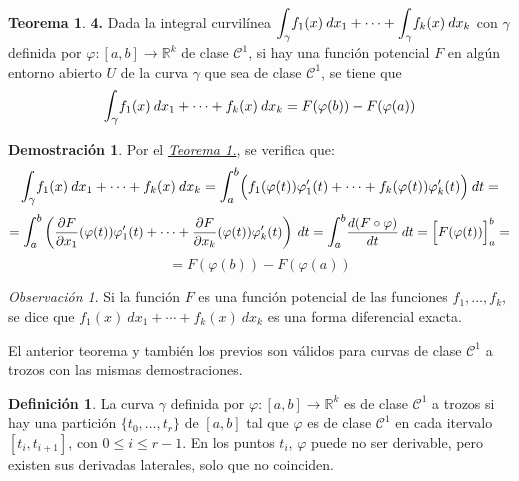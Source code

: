 \documentclass[12pt,twoside]{report}
\newcommand\mc[1]{\mathcal{#1}}
\theoremstyle{azul}
\theoremstyle{azul2}
\theoremstyle{plain}
\theoremstyle{definition}
\newtheorem{defin}{Definición}[chapter]
\newtheorem*{dem}{Demostración}
\newtheorem*{theo}{Teorema}
\theoremstyle{remark}
\newtheorem*{obs}{Observación}
\begin{document}
\begin{theo} \textbf{4.}
Dada la integral curvilínea $\mathlarger{\int_{\gamma}} f_1(x) \: dx_1 + \cdots + \mathlarger{\int_{\gamma}} f_k(x) \: dx_k$ con $\gamma$ definida por $\varphi: [a,b] \longrightarrow \mathbb{R}^k$ de clase $\mc{C}^1$, si hay una función potencial $F$ en algún entorno abierto $U$ de la curva $\gamma$ que sea de clase $\mc{C}^1$, se tiene que $$\mathlarger{\int_{\gamma}} f_1(x) \: dx_1 + \cdots +  f_k(x) \: dx_k=F(\varphi(b)) - F(\varphi(a))$$ 
\end{theo}
\begin{dem}
Por el \hyperref[teo11]{\textit{Teorema 1.}}, se verifica que: $$\mathlarger{\int_{\gamma}} f_1(x) \: dx_1 + \cdots +  f_k(x) \: dx_k = \mathlarger{\int_{a}^b} \Big( f_1(\varphi(t)) \varphi_1'(t) + \cdots + f_k(\varphi(t)) \varphi_k'(t) \Big)\: dt =$$ $$=\mathlarger{\int_{a}^b} \left(\dfrac{\partial F}{\partial x_1}(\varphi(t)) \varphi_1'(t) + \cdots + \dfrac{\partial F}{\partial x_k}(\varphi(t)) \varphi_k'(t) \right) \: dt = \mathlarger{\int_{a}^b} \dfrac{d(F \circ \varphi)}{dt} \: dt = \Big[ F(\varphi(t)) \Big]_a^b = $$ $$=F(\varphi(b)) - F(\varphi(a))$$

\end{dem}
\begin{obs}
Si la función $F$ es una función potencial de las funciones $f_1, \ldots, f_k$, se dice que $f_1(x) \: dx_1 + \cdots +  f_k(x) \: dx_k$ es una forma diferencial exacta.
\end{obs}

El anterior teorema y también los previos son válidos para curvas de clase $\mc{C}^1$ a trozos con las mismas demostraciones.

\begin{defin}
La curva $\gamma$ definida por $\varphi: [a,b] \longrightarrow \mathbb{R}^k$ es de clase $\mc{C}^1$ a trozos si hay una partición $\{t_0, \ldots, t_r\}$ de $[a,b]$ tal que $\varphi$ es de clase $\mc{C}^1$ en cada itervalo $[t_i, t_{i+1}]$, con $0 \leq i \leq r-1$.
En los puntos $t_i$, $\varphi$ puede no ser derivable, pero existen sus derivadas laterales, solo que no coinciden.

\end{defin}
\end{document}
